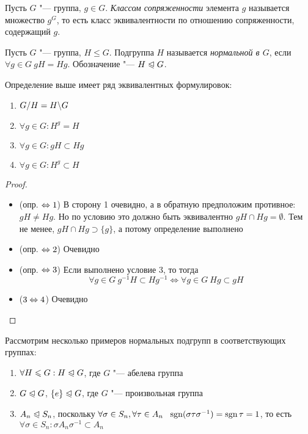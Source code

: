 \begin{definition}
	Пусть $G$ "--- группа, $g \in G$. \textit{Классом сопряженности} элемента $g$ называется множество $g^G$, то есть класс эквивалентности по отношению сопряженности, содержащий $g$.
\end{definition}

\begin{definition}
	Пусть $G$ "--- группа, $H \le G$. Подгруппа $H$ называется \textit{нормальной в $G$}, если $\forall g \in G\ gH = Hg$. Обозначение "--- $H \trianglelefteqslant G$.
\end{definition}

\begin{proposition}
	Определение выше имеет ряд эквивалентных формулировок:
	\begin{enumerate}
		\item $G / H = H \backslash G$
		
		\item $\forall g \in G: H^g = H$
		
		\item $\forall g \in G: gH \subset Hg$
		
		\item $\forall g \in G: H^g \subset H$
	\end{enumerate}
\end{proposition}

\begin{proof}~
	\begin{itemize}
		\item (опр. $\Leftrightarrow 1$) В сторону 1 очевидно, а в обратную предположим противное: $gH \neq Hg$. Но по условию это должно быть эквивалентно $gH \cap Hg = \emptyset$. Тем не менее, $gH \cap Hg \supset \{g\}$, а потому определение выполнено
		
		\item (опр. $\Leftrightarrow 2$) Очевидно
		
		\item (опр. $\Leftrightarrow 3$) Если выполнено условие 3, то тогда
		\[
		\forall g \in G\ g^{-1}H \subset Hg^{-1} \Longleftrightarrow \forall g \in G\ Hg \subset gH
		\]
		
		\item ($3 \Leftrightarrow 4$) Очевидно
	\end{itemize}
\end{proof}

\begin{example}
	Рассмотрим несколько примеров нормальных подгрупп в соответствующих группах:
	\begin{enumerate}
		\item $\forall H \leqslant G: H \trianglelefteqslant G$, где $G$ "--- абелева группа
		\item $G \trianglelefteqslant G$, $\{e\} \trianglelefteqslant G$, где $G$ "--- произвольная группа
		\item $A_n \trianglelefteqslant S_n$, поскольку $\forall \sigma \in S_n, \forall \tau \in A_n\ \ \sgn(\sigma\tau\sigma^{-1}) = \sgn\tau = 1$, то есть $\forall \sigma \in S_n: \sigma A_n\sigma^{-1} \subset A_n$
	\end{enumerate}
\end{example}

